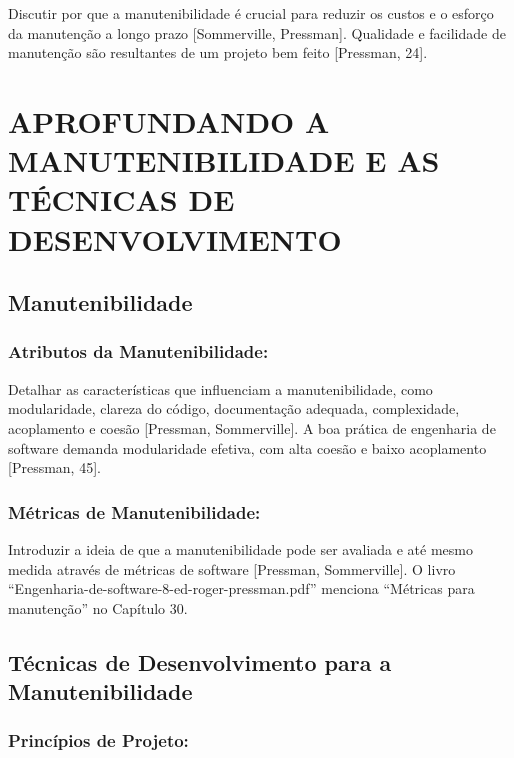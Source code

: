 \documentclass[
]{book}
\begin{document}
Discutir por que a manutenibilidade é crucial para reduzir os custos e o esforço da manutenção a longo prazo {[}Sommerville, Pressman{]}. Qualidade e facilidade de manutenção são resultantes de um projeto bem feito {[}Pressman, 24{]}.

\chapter{APROFUNDANDO A MANUTENIBILIDADE E AS TÉCNICAS DE DESENVOLVIMENTO}\label{aprofundando-a-manutenibilidade-e-as-tuxe9cnicas-de-desenvolvimento}

\section{Manutenibilidade}\label{manutenibilidade}

\subsection{Atributos da Manutenibilidade:}\label{atributos-da-manutenibilidade}

Detalhar as características que influenciam a manutenibilidade, como modularidade, clareza do código, documentação adequada, complexidade, acoplamento e coesão {[}Pressman, Sommerville{]}. A boa prática de engenharia de software demanda modularidade efetiva, com alta coesão e baixo acoplamento {[}Pressman, 45{]}.

\subsection{Métricas de Manutenibilidade:}\label{muxe9tricas-de-manutenibilidade}

Introduzir a ideia de que a manutenibilidade pode ser avaliada e até mesmo medida através de métricas de software {[}Pressman, Sommerville{]}. O livro ``Engenharia-de-software-8-ed-roger-pressman.pdf'' menciona ``Métricas para manutenção'' no Capítulo 30.

\section{Técnicas de Desenvolvimento para a Manutenibilidade}\label{tuxe9cnicas-de-desenvolvimento-para-a-manutenibilidade}

\subsection{Princípios de Projeto:}\label{princuxedpios-de-projeto}
\end{document}
